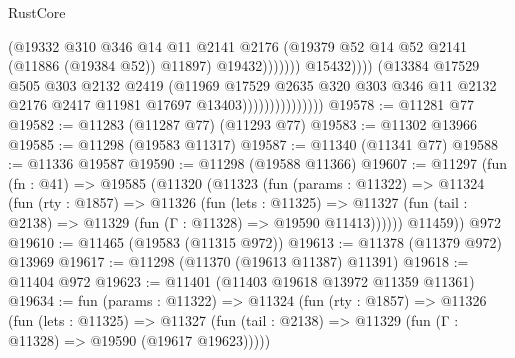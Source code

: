 \begin{lexlean}{RustCore}
\begin{coremodule}
                                                  (@19332
                                                    @310
                                                    @346
                                                    @14
                                                    @11
                                                    @2141
                                                    @2176
                                                    (@19379
                                                      @52
                                                      @14
                                                      @52
                                                      @2141
                                                      (@11886 (@19384 @52))
                                                      @11897)
                                                    @19432)))))))
                                      @15432))))
                              (@13384
                                @17529
                                @505
                                @303
                                @2132
                                @2419
                                (@11969
                                  @17529
                                  @2635
                                  @320
                                  @303
                                  @346
                                  @11
                                  @2132
                                  @2176
                                  @2417
                                  @11981
                                  @17697
                                  @13403)))))))))))))))
@19578 := @11281 @77
@19582 := @11283 (@11287 @77) (@11293 @77)
@19583 := @11302 @13966
@19585 := @11298 (@19583 @11317)
@19587 := @11340 (@11341 @77)
@19588 := @11336 @19587
@19590 := @11298 (@19588 @11366)
@19607 := @11297
    (fun (fn : @41) =>
    @19585
      (@11320
        (@11323
          (fun (params : @11322) =>
          @11324
            (fun (rty : @1857) =>
            @11326
              (fun (lets : @11325) =>
              @11327 (fun (tail : @2138) => @11329 (fun (Γ : @11328) => @19590 @11413))))))
        @11459))
    @972
@19610 := @11465 (@19583 (@11315 @972))
@19613 := @11378 (@11379 @972) @13969
@19617 := @11298 (@11370 (@19613 @11387) @11391)
@19618 := @11404 @972
@19623 := @11401 (@11403 @19618 @13972 @11359 @11361)
@19634 := fun (params : @11322) =>
  @11324
    (fun (rty : @1857) =>
    @11326
      (fun (lets : @11325) =>
      @11327 (fun (tail : @2138) => @11329 (fun (Γ : @11328) => @19590 (@19617 @19623)))))

\end{coremodule}
\end{lexlean}
